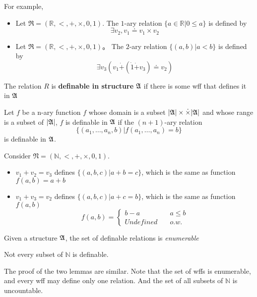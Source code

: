 For example,

\begin{itemize}
    \item Let $\mathfrak{R} = (\mathbb{R},<,+,\times,0,1)$. The $1$-ary relation $\{ a \in \mathbb{R} | 0 \le a \}$ is defined by
    \[ \exists v_2, v_1 \doteq v_1 \times v_2 \]
    \item Let $\mathfrak{R} = (\mathbb{R},<,+,\times,0,1)$。 The $2$-ary relation $\{ (a,b) | a < b \}$ is defined by
    \[ \exists v_3 (v_1\dot{+}(\dot{1}\dot{+}v_3)\doteq v_2) \]
\end{itemize}

\begin{definition}
    The relation $R$ is \textbf{definable in structure} $\mathfrak{A}$ if there is some wff that defines it in $\mathfrak{A}$

    Let $f$ be a n-ary function $f$ whose domain is a subset $|\mathfrak{A}| \times \dot \times |\mathfrak{A}|$ and whose range is a subset of $|\mathfrak{A}|$, $f$ is definable in $\mathfrak{A}$ if the $(n+1)$-ary relation
    \[ \{ (a_1,\dots,a_n, b) | f(a_1,\dots,a_n) = b \} \]
    is definable in $\mathfrak{A}$.
\end{definition}

Consider $\mathfrak{N} = (\mathbb{N},<,+,\times,0,1)$.
\begin{itemize}
    \item $v_1 + v_2 = v_3$ defines $\{ (a,b,c) | a + b = c \}$, which is the same as function $f(a,b) = a + b$
    \item $v_1 + v_3 = v_2$ defines $\{ (a,b,c) | a+c = b \}$, which is the same as function $f(a,b)$
    \[ f(a,b) = \begin{cases}
        b - a &\quad a \le b\\
        Undefined &\quad o.w.
    \end{cases} \]
\end{itemize}

\begin{lemma}
    Given a structure $\mathfrak{A}$, the set of definable relations is \emph{enumerable}
\end{lemma}
\begin{lemma}
    Not every subset of $\mathbb{N}$ is definable.
\end{lemma}

The proof of the two lemmas are similar. Note that the set of wffs is enumerable, and every wff may define only one relation. And the set of all subsets of $\mathbb{N}$ is uncountable.

